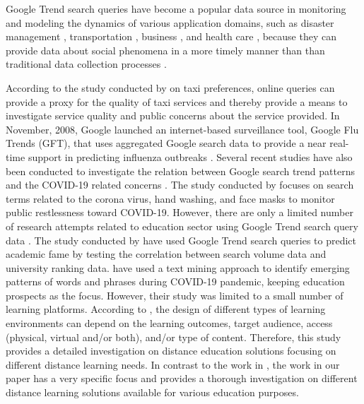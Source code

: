 \documentclass[11pt,a4paper,]{article}
\begin{document}
Google Trend search queries have become a popular data source in monitoring and modeling the dynamics of various application domains, such as disaster management \autocite{kam2019monitoring}, transportation \autocite{willis2020using}, business \autocite{chumnumpan2019understanding}, and health care \autocite{nuti2014use,alicino2015assessing,arora2019google,carneiro2009google,cook2011assessing}, because they can provide data about social phenomena in a more timely manner than than traditional data collection processes \autocite{vaughan2014web}.

According to the study conducted by \textcite{willis2020using} on taxi preferences, online queries can provide a proxy for the quality of taxi services and thereby provide a means to investigate service quality and public concerns about the service provided. In November, 2008, Google launched an internet-based surveillance tool, Google Flu Trends (GFT), that uses aggregated Google search data to provide a near real-time support in predicting influenza outbreaks \autocite{cook2011assessing}. Several recent studies have also been conducted to investigate the relation between Google search trend patterns and the COVID-19 related concerns \autocite{husnayain2020applications,effenberger2020association}. The study conducted by \textcite{husnayain2020applications} focuses on search terms related to the corona virus, hand washing, and face masks to monitor public restlessness toward COVID-19. However, there are only a limited number of research attempts related to education sector using Google Trend search query data \autocite{vaughan2014web}. The study conducted by \textcite{vaughan2014web} have used Google Trend search queries to predict academic fame by testing the correlation between search volume data and university ranking data. \textcite{kansal2021google} have used a text mining approach to identify emerging patterns of words and phrases during COVID-19 pandemic, keeping education prospects as the focus. However, their study was limited to a small number of learning platforms. According to \textcite{moore2011learning}, the design of different types of learning environments can depend on the learning outcomes, target audience, access (physical, virtual and/or both), and/or type of content. Therefore, this study provides a detailed investigation on distance education solutions focusing on different distance learning needs. In contrast to the work in \textcite{kansal2021google}, the work in our paper has a very specific focus and provides a thorough investigation on different distance learning solutions available for various education purposes.
\end{document}
